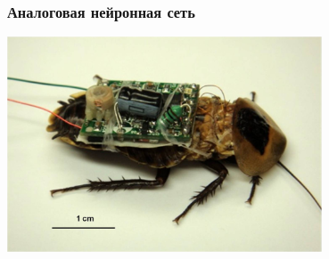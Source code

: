\documentclass[24pt,pdf,hyperref={unicode},aspectratio=169]{beamer}
\begin{document}
\begin{frame}\frametitle{Аналоговая нейронная сеть}
\begin{center}
\includegraphics[width=0.7\textwidth]{Images/cyborg.jpg}
\end{center}
\end{frame}
\end{document}
